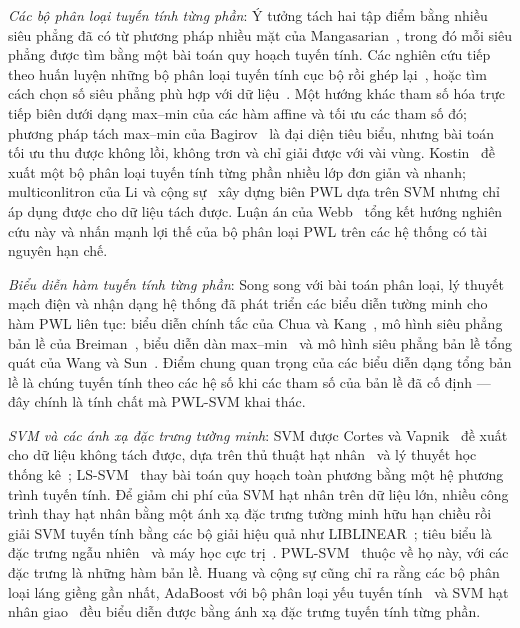 \emph{Các bộ phân loại tuyến tính từng phần}: Ý tưởng tách hai tập điểm bằng nhiều siêu phẳng đã có từ phương pháp nhiều mặt của Mangasarian~\cite{mangasarian1968}, trong đó mỗi siêu phẳng được tìm bằng một bài toán quy hoạch tuyến tính. Các nghiên cứu tiếp theo huấn luyện những bộ phân loại tuyến tính cục bộ rồi ghép lại~\cite{sklansky1980}, hoặc tìm cách chọn số siêu phẳng phù hợp với dữ liệu~\cite{tenmoto1998}. Một hướng khác tham số hóa trực tiếp biên dưới dạng max--min của các hàm affine và tối ưu các tham số đó; phương pháp tách max--min của Bagirov~\cite{bagirov2005} là đại diện tiêu biểu, nhưng bài toán tối ưu thu được không lồi, không trơn và chỉ giải được với vài vùng. Kostin~\cite{kostin2006} đề xuất một bộ phân loại tuyến tính từng phần nhiều lớp đơn giản và nhanh; multiconlitron của Li và cộng sự~\cite{li2011} xây dựng biên PWL dựa trên SVM nhưng chỉ áp dụng được cho dữ liệu tách được. Luận án của Webb~\cite{webb2010} tổng kết hướng nghiên cứu này và nhấn mạnh lợi thế của bộ phân loại PWL trên các hệ thống có tài nguyên hạn chế.

\emph{Biểu diễn hàm tuyến tính từng phần}: Song song với bài toán phân loại, lý thuyết mạch điện và nhận dạng hệ thống đã phát triển các biểu diễn tường minh cho hàm PWL liên tục: biểu diễn chính tắc của Chua và Kang~\cite{chua1977}, mô hình siêu phẳng bản lề của Breiman~\cite{breiman1993}, biểu diễn dàn max--min~\cite{tarela1999,ovchinnikov2002} và mô hình siêu phẳng bản lề tổng quát của Wang và Sun~\cite{wang2005}. Điểm chung quan trọng của các biểu diễn dạng tổng bản lề là chúng tuyến tính theo các hệ số khi các tham số của bản lề đã cố định --- đây chính là tính chất mà PWL-SVM khai thác.

\emph{SVM và các ánh xạ đặc trưng tường minh}: SVM được Cortes và Vapnik~\cite{cortes1995} đề xuất cho dữ liệu không tách được, dựa trên thủ thuật hạt nhân~\cite{boser1992} và lý thuyết học thống kê~\cite{vapnik1998}; LS-SVM~\cite{suykens1999ls,suykens2002} thay bài toán quy hoạch toàn phương bằng một hệ phương trình tuyến tính. Để giảm chi phí của SVM hạt nhân trên dữ liệu lớn, nhiều công trình thay hạt nhân bằng một ánh xạ đặc trưng tường minh hữu hạn chiều rồi giải SVM tuyến tính bằng các bộ giải hiệu quả như LIBLINEAR~\cite{fan2008}; tiêu biểu là đặc trưng ngẫu nhiên~\cite{rahimi2007} và máy học cực trị~\cite{huanggb2006}. PWL-SVM~\cite{huang2013} thuộc về họ này, với các đặc trưng là những hàm bản lề. Huang và cộng sự cũng chỉ ra rằng các bộ phân loại láng giềng gần nhất, AdaBoost với bộ phân loại yếu tuyến tính~\cite{freund1995} và SVM hạt nhân giao~\cite{maji2008} đều biểu diễn được bằng ánh xạ đặc trưng tuyến tính từng phần.


